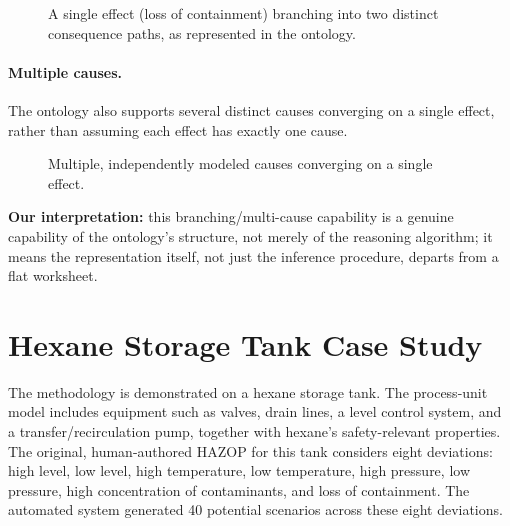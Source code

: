 \begin{figure}[htbp]
\centering
{}
\caption[Branching consequence paths]{A single effect (loss of containment) branching into two distinct consequence paths, as represented in the ontology.}
\label{fig:w2-branch}
\end{figure}

\paragraph{Multiple causes.} The ontology also supports several distinct causes converging on a single effect, rather than assuming each effect has exactly one cause.

\begin{figure}[htbp]
\centering
{}
\caption[Multiple causes converging on one effect]{Multiple, independently modeled causes converging on a single effect.}
\label{fig:w2-multicause}
\end{figure}

\textbf{Our interpretation:} this branching/multi-cause capability is a genuine capability of the ontology's structure, not merely of the reasoning algorithm; it means the representation itself, not just the inference procedure, departs from a flat worksheet.

\section{Hexane Storage Tank Case Study}
\label{sec:w2-casestudy}
The methodology is demonstrated on a hexane storage tank. The process-unit model includes equipment such as valves, drain lines, a level control system, and a transfer/recirculation pump, together with hexane's safety-relevant properties. The original, human-authored HAZOP for this tank considers eight deviations: high level, low level, high temperature, low temperature, high pressure, low pressure, high concentration of contaminants, and loss of containment. The automated system generated 40 potential scenarios across these eight deviations.

